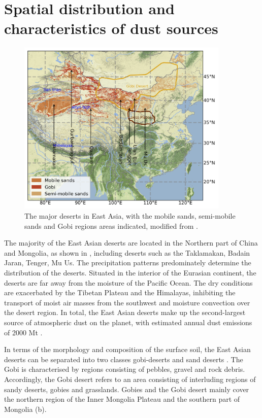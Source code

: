 \section{Spatial distribution and characteristics of dust sources}\label{sec:spatial_temporal_dust}
\begin{figure}
    \centering
    \includegraphics[width=0.9\textwidth]{texfiles/figs/map_sources_china.png}
    \caption{The major deserts in East Asia, with the mobile sands, semi-mobile sands and Gobi regions areas indicated, modified from \textcite{mao2013numerical}. }
    \label{fig:maps_deserts}
\end{figure}
The majority of the East Asian deserts are located in the Northern part of China and Mongolia, as shown in , including deserts such as the Taklamakan, Badain Jaran, Tenger, Mu Us. The precipitation patterns predominately determine the distribution of the deserts.
Situated in the interior of the Eurasian continent, the deserts are far away from the moisture of the Pacific Ocean. 
The dry conditions are exacerbated by the Tibetan Plateau and the Himalayas, inhibiting the transport of moist air masses from the southwest and moisture convection over the desert region.  
In total, the East Asian deserts make up the second-largest source of atmospheric dust on the planet, with estimated annual dust emissions of 2000 Mt \parencite{chen2017overview}. 

In terms of the morphology and composition of the surface soil, the East Asian deserts can be separated into two classes gobi-deserts and sand deserts \parencite{xuan2002characterization}. The Gobi is characterised by regions consisting of pebbles, gravel and rock debris. Accordingly, the Gobi desert refers to an area consisting of interluding regions of sandy deserts, gobies and grasslands.
Gobies and the Gobi desert mainly cover the northern region of the Inner Mongolia Plateau and the southern part of Mongolia (b). 

